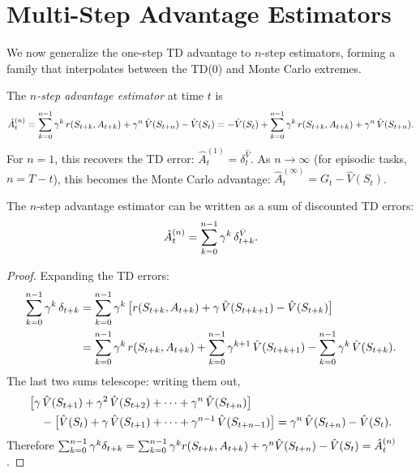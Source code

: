 \documentclass[11pt,a4paper]{article}
\begin{document}
\section{Multi-Step Advantage Estimators}

We now generalize the one-step TD advantage to $n$-step estimators,
forming a family that interpolates between the TD(0) and Monte Carlo
extremes.

\begin{definition}
\label{def:n-step-advantage}
The \emph{$n$-step advantage estimator} at time $t$ is
\[
  \hat{A}_t^{(n)} = \sum_{k=0}^{n-1} \gamma^k\, r(S_{t+k}, A_{t+k})
  + \gamma^n\, \hat{V}(S_{t+n}) - \hat{V}(S_t)
  = -\hat{V}(S_t) + \sum_{k=0}^{n-1} \gamma^k\, r(S_{t+k}, A_{t+k})
  + \gamma^n\, \hat{V}(S_{t+n}).
\]
For $n = 1$, this recovers the TD error: $\hat{A}_t^{(1)} = \delta_t^{\hat{V}}$.
As $n \to \infty$ (for episodic tasks, $n = T - t$), this becomes the
Monte Carlo advantage: $\hat{A}_t^{(\infty)} = G_t - \hat{V}(S_t)$.
\end{definition}

\begin{proposition}
\label{prop:n-step-td}
The $n$-step advantage estimator can be written as a sum of discounted
TD errors:
\[
  \hat{A}_t^{(n)} = \sum_{k=0}^{n-1} \gamma^k\, \delta_{t+k}^{\hat{V}}.
\]
\end{proposition}

\begin{proof}
Expanding the TD errors:
\begin{align*}
  \sum_{k=0}^{n-1} \gamma^k\, \delta_{t+k}
  &= \sum_{k=0}^{n-1} \gamma^k\, \bigl[r(S_{t+k}, A_{t+k})
    + \gamma\, \hat{V}(S_{t+k+1}) - \hat{V}(S_{t+k})\bigr] \\
  &= \sum_{k=0}^{n-1} \gamma^k\, r(S_{t+k}, A_{t+k})
    + \sum_{k=0}^{n-1} \gamma^{k+1}\, \hat{V}(S_{t+k+1})
    - \sum_{k=0}^{n-1} \gamma^k\, \hat{V}(S_{t+k}).
\end{align*}
The last two sums telescope: writing them out,
\begin{align*}
  &\bigl[\gamma\, \hat{V}(S_{t+1}) + \gamma^2\, \hat{V}(S_{t+2})
    + \cdots + \gamma^n\, \hat{V}(S_{t+n})\bigr] \\
  &\quad - \bigl[\hat{V}(S_t) + \gamma\, \hat{V}(S_{t+1})
    + \cdots + \gamma^{n-1}\, \hat{V}(S_{t+n-1})\bigr]
  = \gamma^n\, \hat{V}(S_{t+n}) - \hat{V}(S_t).
\end{align*}
Therefore $\sum_{k=0}^{n-1} \gamma^k \delta_{t+k} =
\sum_{k=0}^{n-1} \gamma^k r(S_{t+k}, A_{t+k}) + \gamma^n
\hat{V}(S_{t+n}) - \hat{V}(S_t) = \hat{A}_t^{(n)}$.
\end{proof}
\end{document}
